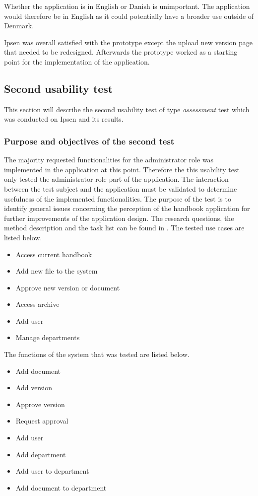 Whether the application is in English or Danish is unimportant.
The application would therefore be in English as it could potentially have a broader use outside of Denmark.

Ipsen was overall satisfied with the prototype except the upload new version page that needed to be redesigned.
Afterwards the prototype worked as a starting point for the implementation of the application.

\subsection{Second usability test}\label{secondtest}
This section will describe the second usability test of type \textit{assessment} test which was conducted on Ipsen and its results.

\subsubsection*{Purpose and objectives of the second test}
The majority requested functionalities for the administrator role was implemented in the application at this point.
Therefore the this usability test only tested the administrator role part of the application.
The interaction between the test subject and the application must be validated to determine usefulness of the implemented functionalities.
The purpose of the test is to identify general issues concerning the perception of the handbook application for further improvements of the application design.
The research questions, the method description and the task list can be found in .
The tested use cases are listed below.

\begin{itemize}
	\item Access current handbook
	\item Add new file to the system
	\item Approve new version or document
	\item Access archive
	\item Add user
	\item Manage departments
\end{itemize}

The functions of the system that was tested are listed below.

\begin{itemize}
	\item Add document
	\item Add version
	\item Approve version
	\item Request approval
	\item Add user
	\item Add department
	\item Add user to department
	\item Add document to department
\end{itemize}

